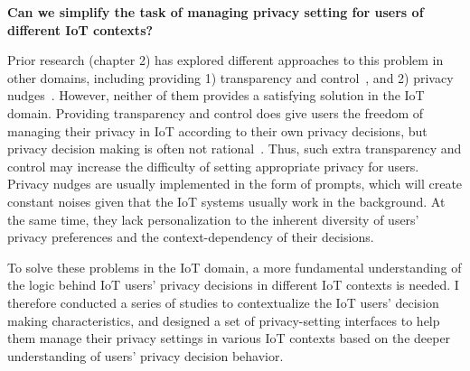 \textbf{Can we simplify the task of managing privacy setting for users of different IoT contexts?}

Prior research (chapter 2) has explored different approaches to this problem in other domains, including providing 1) transparency and control~\cite{egelman2009timing,acquisti2006imagined,knijnenburg2015user,benisch2011capturing,brodie2004personalization}, and 2) privacy nudges~\cite{almuhimedi2015your,liu2016follow,fu2014field,liu2016follow}. However, neither of them provides a satisfying solution in the IoT domain. Providing transparency and control does give users the freedom of managing their privacy in IoT according to their own privacy decisions, but privacy decision making is often not rational~\cite{knijnenburg2015user}. Thus, such extra transparency and control may increase the difficulty of setting appropriate privacy for users. Privacy nudges are usually implemented in the form of prompts, which will create constant noises given that the IoT systems usually work in the background. At the same time, they lack personalization to the inherent diversity of users’ privacy preferences and the context-dependency of their decisions.

To solve these problems in the IoT domain, a more fundamental understanding of the logic behind IoT users' privacy decisions in different IoT contexts is needed. I therefore conducted a series of studies to contextualize the IoT users' decision making characteristics, and designed a set of privacy-setting interfaces to help them manage their privacy settings in various IoT contexts based on the deeper understanding of users' privacy decision behavior. 

